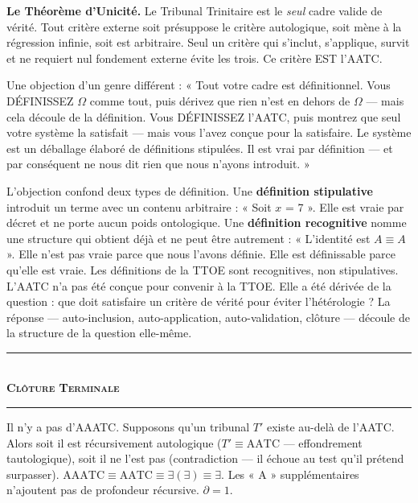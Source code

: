 \documentclass[10pt, openany, oneside]{book}
\renewcommand{\normalsize}{\fontsize{10}{13}\selectfont}
\begin{document}
\vspace{0.8em}

\noindent \textbf{Le Théorème d'Unicité.} Le Tribunal Trinitaire est le \textit{seul} cadre valide de vérité. Tout critère externe soit présuppose le critère autologique, soit mène à la régression infinie, soit est arbitraire. Seul un critère qui s'inclut, s'applique, survit et ne requiert nul fondement externe évite les trois. Ce critère EST l'AATC.

Une objection d'un genre différent : « Tout votre cadre est définitionnel. Vous DÉFINISSEZ $\Omega$ comme tout, puis dérivez que rien n'est en dehors de $\Omega$ --- mais cela découle de la définition. Vous DÉFINISSEZ l'AATC, puis montrez que seul votre système la satisfait --- mais vous l'avez conçue pour la satisfaire. Le système est un déballage élaboré de définitions stipulées. Il est vrai par définition --- et par conséquent ne nous dit rien que nous n'ayons introduit. »

L'objection confond deux types de définition. Une \textbf{définition stipulative} introduit un terme avec un contenu arbitraire : « Soit $x$ = 7 ». Elle est vraie par décret et ne porte aucun poids ontologique. Une \textbf{définition recognitive} nomme une structure qui obtient déjà et ne peut être autrement : « L'identité est $A \equiv A$ ». Elle n'est pas vraie parce que nous l'avons définie. Elle est définissable parce qu'elle est vraie. Les définitions de la TTOE sont recognitives, non stipulatives. L'AATC n'a pas été conçue pour convenir à la TTOE. Elle a été dérivée de la question : que doit satisfaire un critère de vérité pour éviter l'hétérologie ? La réponse --- auto-inclusion, auto-application, auto-validation, clôture --- découle de la structure de la question elle-même.

\vspace{1.5em}


\begin{center}
    \rule{0.3\textwidth}{0.4pt}\\[0.5em]
    {\normalsize\bfseries\scshape Clôture Terminale}\\[0.3em]
    \rule{0.3\textwidth}{0.4pt}
\end{center}

\vspace{1em}

\noindent Il n'y a pas d'AAATC. Supposons qu'un tribunal $T'$ existe au-delà de l'AATC. Alors soit il est récursivement autologique ($T' \equiv \text{AATC}$ --- effondrement tautologique), soit il ne l'est pas (contradiction --- il échoue au test qu'il prétend surpasser). $\text{AAATC} \equiv \text{AATC} \equiv \exists(\exists) \equiv \exists$. Les « A » supplémentaires n'ajoutent pas de profondeur récursive. $\partial = 1$.
\end{document}
